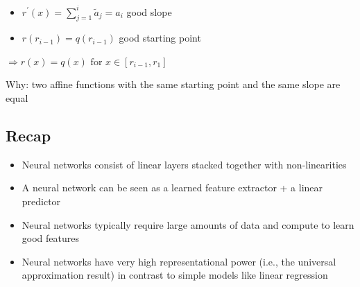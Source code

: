 \begin{itemize}
  \item $r^{\prime}(x)=\sum_{j=1}^{i} \tilde{a}_{j}=a_{i}$ good slope
  \item $r\left(r_{i-1}\right)=q\left(r_{i-1}\right)$ good starting point
\end{itemize}



$
\Longrightarrow r(x)=q(x) \text { for } x \in\left[r_{i-1}, r_{1}\right]
$

Why: two affine functions with the same starting point and the same slope are equal

\subsection*{Recap}
\begin{itemize}
  \item Neural networks consist of linear layers stacked together with non-linearities

  \item A neural network can be seen as a learned feature extractor + a linear predictor

  \item Neural networks typically require large amounts of data and compute to learn good features

  \item Neural networks have very high representational power (i.e., the universal approximation result) in contrast to simple models like linear regression

\end{itemize}